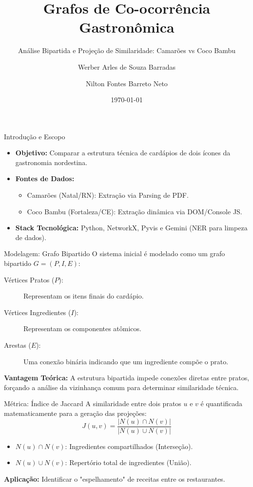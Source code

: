 \documentclass[10pt]{beamer}
\title{Grafos de Co-ocorrência Gastronômica}
\subtitle{Análise Bipartida e Projeção de Similaridade: Camarões vs Coco Bambu}
\author{Werber Arles de Souza Barradas \and Nilton Fontes Barreto Neto}
\institute{DCA3304 - Estrutura de Dados II \\ Universidade Federal do Rio Grande do Norte (UFRN)}
\date{\today}
\begin{document}
\maketitle

\begin{frame}{Introdução e Escopo}
    \begin{itemize}
        \item \textbf{Objetivo:} Comparar a estrutura técnica de cardápios de dois ícones da gastronomia nordestina.
        \item \textbf{Fontes de Dados:}
            \begin{itemize}
                \item Camarões (Natal/RN): Extração via Parsing de PDF.
                \item Coco Bambu (Fortaleza/CE): Extração dinâmica via DOM/Console JS.
            \end{itemize}
        \item \textbf{Stack Tecnológica:} Python, NetworkX, Pyvis e Gemini (NER para limpeza de dados).
    \end{itemize}
\end{frame}

\begin{frame}{Modelagem: Grafo Bipartido}
    O sistema inicial é modelado como um grafo bipartido $G = (P, I, E)$:
    \begin{description}
        \item[Vértices Pratos ($P$):] Representam os itens finais do cardápio.
        \item[Vértices Ingredientes ($I$):] Representam os componentes atômicos.
        \item[Arestas ($E$):] Uma conexão binária indicando que um ingrediente compõe o prato.
    \end{description}
    \vspace{0.3cm}
    \textbf{Vantagem Teórica:} A estrutura bipartida impede conexões diretas entre pratos, forçando a análise da vizinhança comum para determinar similaridade técnica.
\end{frame}

\begin{frame}{Métrica: Índice de Jaccard}
    A similaridade entre dois pratos $u$ e $v$ é quantificada matematicamente para a geração das projeções:
    \[ J(u,v) = \frac{|N(u) \cap N(v)|}{|N(u) \cup N(v)|} \]
    \begin{itemize}
        \item $N(u) \cap N(v)$: Ingredientes compartilhados (Interseção).
        \item $N(u) \cup N(v)$: Repertório total de ingredientes (União).
    \end{itemize}
    \textbf{Aplicação:} Identificar o "espelhamento" de receitas entre os restaurantes.
\end{frame}
\end{document}
